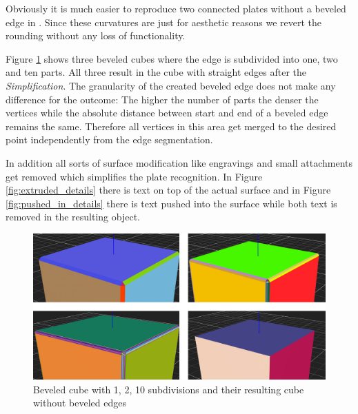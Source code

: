 \documentclass[../ClassicThesis.tex]{subfiles}
\begin{document}
Obviously it is much easier to reproduce two connected plates without a beveled edge in . Since these curvatures are just for aesthetic reasons we revert the rounding without any loss of functionality.

Figure \ref{fig:beveled} shows three beveled cubes where the edge is subdivided into one, two and ten parts. All three result in the cube with straight edges after the \emph{Simplification}. The granularity of the created beveled edge does not make any difference for the outcome:
The higher the number of parts the denser the vertices while the absolute distance between start and end of a beveled edge remains the same. Therefore all vertices in this area get merged to the desired point independently from the edge segmentation.

In addition all sorts of surface modification like engravings and small attachments get removed which simplifies the plate recognition. In Figure \ref{fig:extruded_details} there is text on top of the actual surface and in Figure \ref{fig:pushed_in_details} there is text pushed into the surface while both text is removed in the resulting object.


\begin{figure}
\includegraphics[width=1.0\columnwidth]{Images/04-approx-welding-beveled.png}
\caption{Beveled cube with 1, 2, 10 subdivisions and their resulting cube without beveled edges}
\label{fig:beveled}
\end{figure}
\end{document}
